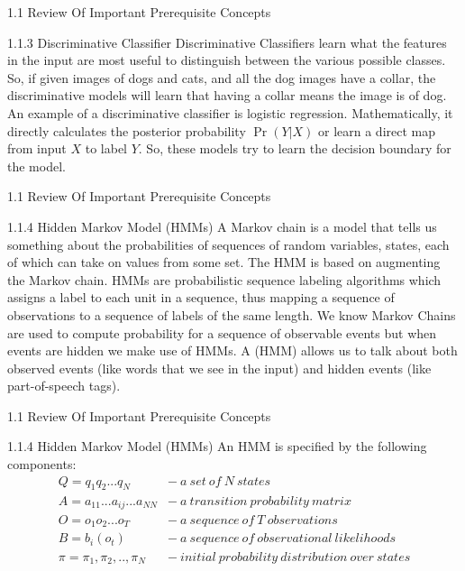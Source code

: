 \documentclass{beamer}
\providecommand{\pr}[1]{\ensuremath{\Pr\left(#1\right)}}
\begin{document}
\begin{frame}{1.1 Review Of Important Prerequisite Concepts}
\begin{block}{1.1.3 Discriminative Classifier}
Discriminative Classifiers learn what the features in the input are most useful to distinguish between the various possible classes. So, if given images of dogs and cats, and all the dog images have a collar, the discriminative models will learn that having a collar means the image is of dog. An example of a discriminative classifier is logistic regression. Mathematically, it directly calculates the posterior probability $\pr{Y|X}$ or learn a direct map from input $X$ to label $Y$. So, these models try to learn the decision boundary for the model.
\end{block}
\end{frame}
\begin{frame}{1.1 Review Of Important Prerequisite Concepts}
\begin{block}{1.1.4 Hidden Markov Model (HMMs)}
A Markov chain is a model that tells us something about the probabilities of sequences of random variables, states, each of which can take on values from some set. The HMM is based on augmenting the Markov chain. HMMs are probabilistic sequence labeling algorithms which assigns a label to each unit in a sequence, thus mapping a sequence of observations to a sequence of labels of the same length. We know Markov Chains are used to compute probability for a sequence of observable events but when events are hidden we make use of HMMs. A (HMM) allows us to talk about both observed events (like words that we see in the input) and hidden events (like part-of-speech tags).
\end{block}
\end{frame}
\begin{frame}{1.1 Review Of Important Prerequisite Concepts}
\begin{block}{1.1.4 Hidden Markov Model (HMMs)}
An HMM is specified by the following components:
\begin{equation}
    \begin{split}
    Q = q_1q_2...q_N                &-\ a\ set\ of\ N\ states\\
    A = a_{11}...a_{ij}...a_{NN}    &-\ a\ transition\ probability\ matrix\\
    O = o_1o_2...o_T                &-\ a\ sequence\ of\ T\ observations\\
    B = b_i(o_t)                    &-\ a\ sequence\ of\ observational\ likelihoods\\
    \pi = \pi_1,\pi_2,..,\pi_N      &-\ initial\ probability\ distribution\ over\ states\\
    \end{split}
\end{equation}
\end{block}
\end{frame}
\end{document}
